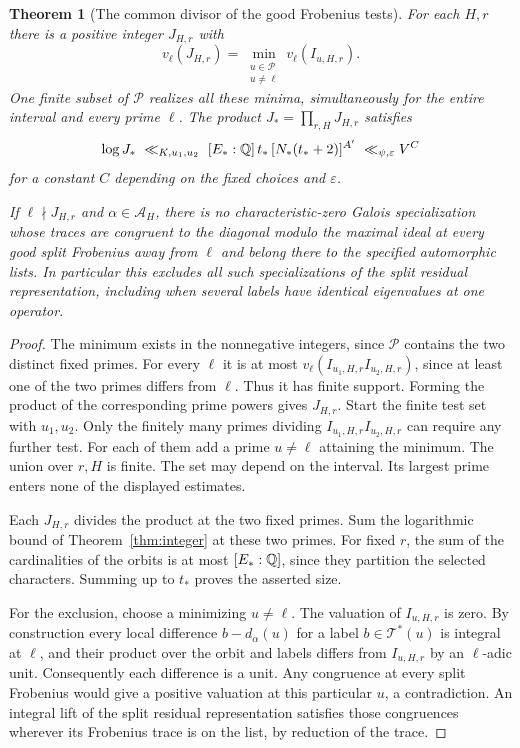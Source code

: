 \documentclass[a4paper,11pt]{article}
\newtheorem{theorem}[proposition]{Theorem}
\theoremstyle{definition}
\theoremstyle{remark}
\numberwithin{equation}{section}
\begin{document}
\begin{theorem}[The common divisor of the good Frobenius tests]\leavevmode\label{thm:heckedivisor345}
For each $H,r$ there is a positive integer $J_{H,r}$ with
\[
 v_\ell(J_{H,r})=\min_{\substack{u\in\mathcal P\\u\ne\ell}}
                         v_\ell(I_{u,H,r}) .
\]
One finite subset of $\mathcal P$ realizes all these minima,
simultaneously for the entire interval and every prime $\ell$.
The product $J_*=\prod_{r,H}J_{H,r}$ satisfies
\[
 \log J_* \ \ll_{K,u_1,u_2}\
      [E_*:\mathbb Q]\,t_*\, [N_*(t_*+2)]^{A'}
        \ \ll_{\psi,\varepsilon} V^{C}
\]
for a constant $C$ depending on the fixed choices and $\varepsilon$.

If $\ell\nmid J_{H,r}$ and $\alpha\in\mathcal A_H$, there is no
characteristic-zero Galois specialization whose traces are congruent
to the diagonal modulo the maximal ideal at every good split
Frobenius away from $\ell$ and belong there to the specified
automorphic lists. In particular this excludes all such
specializations of the split residual representation, including
when several labels have identical eigenvalues at one operator.
\end{theorem}
\begin{proof}
The minimum exists in the nonnegative integers, since $\mathcal P$
contains the two distinct fixed primes. For every $\ell$ it is at
most $v_\ell(I_{u_1,H,r}I_{u_2,H,r})$, since at least one of
the two primes differs from $\ell$. Thus it has finite support. Forming
the product of the corresponding prime powers gives $J_{H,r}$.
Start the finite test set with $u_1,u_2$. Only the finitely many
primes dividing $I_{u_1,H,r}I_{u_2,H,r}$ can require any further
test. For each of them add a prime $u\ne\ell$ attaining the
minimum. The union over $r,H$ is finite. The set may depend on the
interval. Its largest prime enters none of the displayed estimates.

Each $J_{H,r}$ divides the product at the two fixed primes.
Sum the logarithmic bound of Theorem~\ref{thm:integer} at these
two primes. For fixed $r$, the sum of the cardinalities of the
orbits is at most $[E_*:\mathbb Q]$, since they partition the selected
characters. Summing up to $t_*$ proves the asserted size.

For the exclusion, choose a minimizing $u\ne\ell$. The valuation
of $I_{u,H,r}$ is zero. By construction every local difference
$b-d_\alpha(u)$ for a label $b\in\mathcal T^*(u)$ is integral
at $\ell$, and their product over the orbit and labels differs
from $I_{u,H,r}$ by an $\ell$-adic unit. Consequently each
difference is a unit. Any congruence at every split Frobenius
would give a positive valuation at this particular $u$, a
contradiction. An integral lift of the split residual representation
satisfies those congruences wherever its Frobenius trace is on
the list, by reduction of the trace.
\end{proof}
\end{document}
